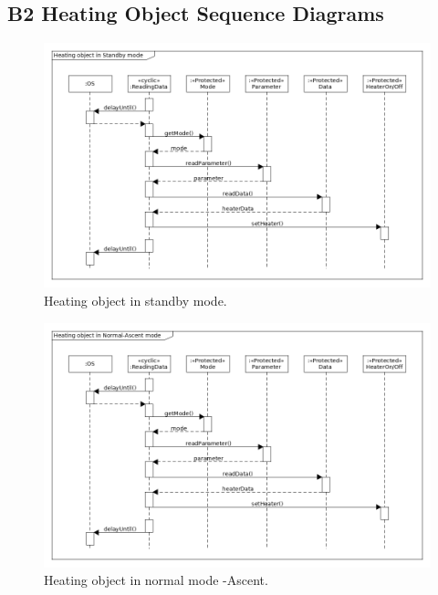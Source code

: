 \subsection*{B2 Heating Object Sequence Diagrams}
\begin{figure}[H]
    \centering
    \includegraphics[height=0.9\textwidth, angle=270]{appendix/img/heater-seq-dia-a.png}
    \caption{Heating object in standby mode.}
    \label{heatera}
\end{figure}
\begin{figure}[H]
    \centering
    \includegraphics[height=0.9\textwidth, angle=270]{appendix/img/heater-seq-dia-b.png}
    \caption{Heating object in normal mode -Ascent.}
    \label{heaterb}
\end{figure}
